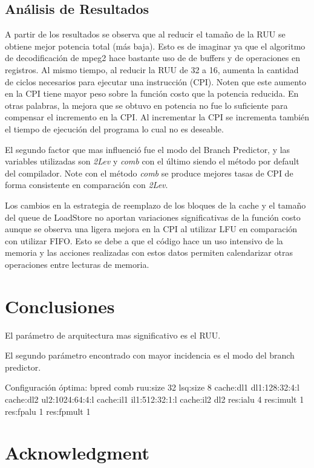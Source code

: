 \documentclass[journal]{IEEEtran}
\begin{document}
\subsection{An\'{a}lisis de Resultados}
A partir de los resultados se observa que al reducir el tama\~{n}o de la RUU se obtiene mejor potencia total (m\'{a}s baja). Esto es de imaginar ya que el algoritmo de decodificaci\'{o}n de mpeg2 hace bastante uso de de buffers y de operaciones en registros. Al mismo tiempo, al reducir la RUU de 32 a 16, aumenta la cantidad de ciclos necesarios para ejecutar una instrucci\'{o}n (CPI). Noten que este aumento en la CPI
tiene mayor peso sobre la funci\'{o}n costo que la potencia reducida. En otras palabras, la mejora que se obtuvo en potencia no fue lo suficiente para compensar el incremento en la CPI. Al incrementar la CPI se incrementa tambi\'{e}n
el tiempo de ejecuci\'{o}n del programa lo cual no es deseable.

El segundo factor que mas influenci\'{o} fue el modo del Branch Predictor, y las variables utilizadas son \textit{2Lev} y \textit{comb} con el \'{u}ltimo siendo el m\'{e}todo por default del compilador. Note con el m\'{e}todo \textit{comb} se produce
mejores tasas de CPI de forma consistente en comparaci\'{o}n con \textit{2Lev}.

Los cambios en la estrategia de reemplazo de los bloques de la cache y el tamaño del queue de LoadStore no aportan variaciones significativas de la funci\'{o}n costo aunque se observa una ligera mejora en la CPI al utilizar LFU en comparaci\'{o}n con utilizar FIFO. Esto se debe a que el c\'{o}digo hace un uso intensivo de la memoria y las acciones realizadas con estos datos permiten calendarizar otras operaciones entre lecturas de memoria.


\section{Conclusiones}
El par\'ametro de arquitectura mas significativo es el RUU.

El segundo par\'ametro encontrado con mayor incidencia es el modo del branch predictor.

Configuraci\'on \'optima:
bpred           comb
ruu:size        32
lsq:size        8
cache:dl1       dl1:128:32:4:l
cache:dl2       ul2:1024:64:4:l
cache:il1       il1:512:32:1:l
cache:il2       dl2
res:ialu        4
res:imult       1
res:fpalu       1
res:fpmult      1


\section*{Acknowledgment}
\end{document}
